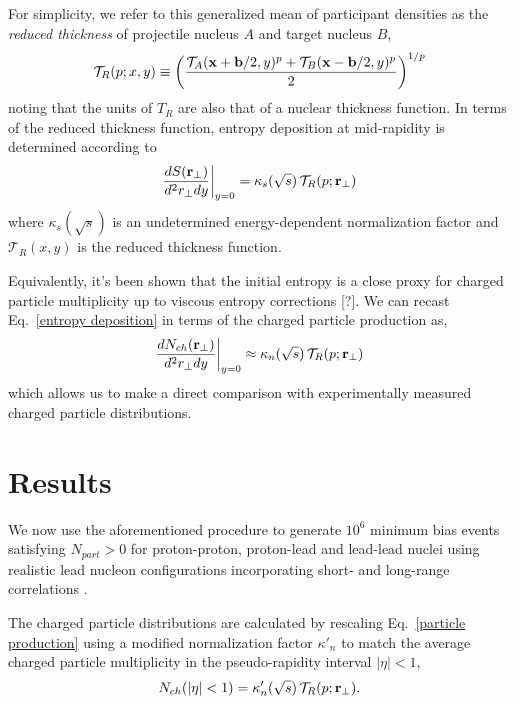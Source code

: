 \documentclass[aps,prl,reprint,amsmath,nofootinbib]{revtex4-1}
\begin{document}
For simplicity, we refer to this generalized mean of participant densities as the \emph{reduced thickness} of
projectile nucleus $A$ and target nucleus $B$,
\begin{equation}
  \label{reduced}
  \mathcal{T}_R(p;x,y) \equiv
  \left( \frac{\mathcal{T}_A({\bf x}+{\bf b}/2,y)^p + \mathcal{T}_B({\bf x}-{\bf b}/2,y)^p}{2} \right)^{1/p}
\end{equation}
noting that the units of $T_R$ are also that of a nuclear thickness function. In terms of the reduced
thickness function, entropy deposition at mid-rapidity is determined according to
\begin{equation}
  \label{entropy deposition}
  \frac{dS({\bf r}_\perp)}{d^2r_\perp dy} \biggr \rvert_{y=0} = \kappa_s(\sqrt{s})\, \mathcal{T}_R(p;{\bf r}_\perp)
\end{equation}
where $\kappa_s(\sqrt{s})$ is an undetermined energy-dependent normalization factor and $\mathcal{T}_R(x,y)$
is the reduced thickness function.

Equivalently, it's been shown that the initial entropy is a close proxy for charged particle multiplicity up
to viscous entropy corrections [?]. We can recast Eq.~\eqref{entropy deposition} in terms of the charged
particle production as,
\begin{equation}
  \label{particle production}
  \frac{dN_{ch}({\bf r}_\perp)}{d^2r_\perp dy} \biggr \rvert_{y=0} \approx
  \kappa_n(\sqrt{s})\, \mathcal{T}_R(p;{\bf r}_\perp)
\end{equation}
which allows us to make a direct comparison with experimentally measured charged particle distributions.

\section{Results}

We now use the aforementioned procedure to generate $10^6$ minimum bias events satisfying $N_{part} > 0$ for
proton-proton, proton-lead and lead-lead nuclei using realistic lead nucleon configurations incorporating
short- and long-range correlations \cite{nucleon-correlations}.

The charged particle distributions are calculated by rescaling Eq.~\eqref{particle production} using a
modified normalization factor $\kappa'_n$ to match the average charged particle multiplicity in the
pseudo-rapidity interval $|\eta| < 1$,
\begin{equation}
  N_{ch}(|\eta|<1) = \kappa'_n(\sqrt{s})\, \mathcal{T}_R(p;{\bf r}_\perp).
\end{equation}
\end{document}
